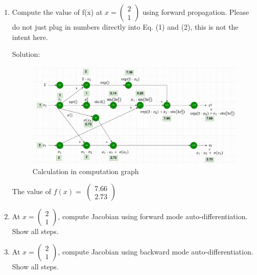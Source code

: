 \documentclass[12pt]{article}
\begin{document}
\begin{enumerate}[label=(\roman*)]
\item Compute the value of f(x) at 
$x=
\begin{pmatrix}
2\\1
\end{pmatrix}$
using forward propagation. Please do not just plug in numbers directly into Eq. (1) and (2), this is not the intent here.

Solution:\\

\begin{figure}[h!]
    \centering
    \includegraphics[width=\textwidth, scale=0.5]{images/Screenshot_2021-04-07 A2_571T drawio - diagrams net(2).png}
    \caption{Calculation in computation graph}
    \label{fig:comp_cal}
\end{figure}

The value of $f(x) = $ 
$\begin{pmatrix} 7.66 \\ 2.73 \end{pmatrix}$



\item At 
$x=
\begin{pmatrix}
2\\1
\end{pmatrix}$,
compute Jacobian using forward mode auto-differentiation. Show all steps.\\

\newpage




\newpage
\item At 
$x=
\begin{pmatrix}
2\\1
\end{pmatrix}$,
compute Jacobian using backward mode auto-differentiation. Show all steps.\\


\end{enumerate}
\end{document}
